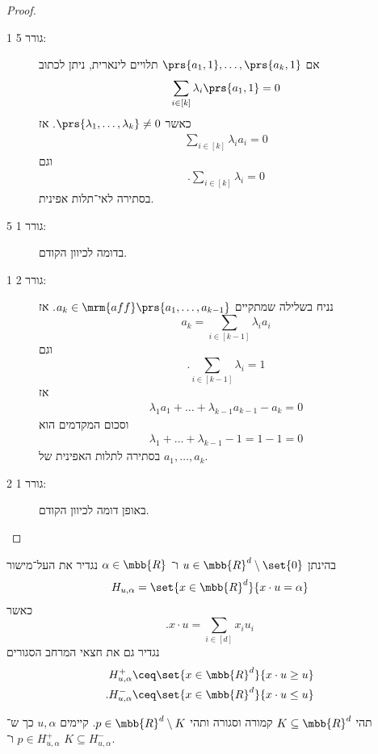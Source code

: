 \documentclass[a4paper,10pt,twoside,openany]{book}
\begin{document}
\begin{proof}
\begin{description}
\item[1 גורר 5:]
אם
$\prs{a_1,1}, \ldots, \prs{a_k,1}$
תלויים לינארית, ניתן לכתוב
\[\sum_{i \in [k]} \lambda_i \prs{a_1, 1} = 0\]
כאשר
$\prs{\lambda_1, \ldots, \lambda_k} \neq 0$.
אז
\begin{align*}
\sum_{i \in [k]} \lambda_i a_i = 0
\end{align*}
וגם
\begin{align*}
\text{.} \sum_{i \in [k]} \lambda_i = 0
\end{align*}
בסתירה לאי־תלות אפינית.
\item[5 גורר 1:]
בדומה לכיוון הקודם.
\item[1 גורר 2:]
נניח בשלילה שמתקיים
$a_k \in \mrm{aff}\prs{a_1, \ldots, a_{k-1}}$.
אז
\[a_k = \sum_{i \in [k-1]} \lambda_i a_i\]
וגם
\[\text{.} \sum_{i \in [k-1]} \lambda_i = 1\]
אז
\begin{align*}
\lambda_1 a_1 + \ldots + \lambda_{k-1} a_{k-1} - a_k = 0
\end{align*}
וסכום המקדמים הוא
\begin{align*}
\lambda_1 + \dots + \lambda_{k-1} - 1 = 1 - 1 = 0
\end{align*}
בסתירה לתלות האפינית של
$a_1, \ldots, a_k$.
\item[2 גורר 1:]
באופן דומה לכיוון הקודם.
\end{description}
\end{proof}

\begin{definition}
בהינתן
$u \in \mbb{R}^d \setminus \set{0}$
ו־%
$\alpha \in \mbb{R}$
נגדיר את העל־מישור
\begin{align*}
H_{u,\alpha} = \set{x \in \mbb{R}^d}{x \cdot u = \alpha}
\end{align*}
כאשר
\[\text{.} x \cdot u = \sum_{i \in [d]} x_i u_i\]
נגדיר גם את חצאי המרחב הסגורים
\begin{align*}
H_{u,\alpha}^+ \ceq \set{x \in \mbb{R}^d}{x \cdot u \geq u} \\
\text{.} H_{u,\alpha}^- \ceq \set{x \in \mbb{R}^d}{x \cdot u \leq u}
\end{align*}
\end{definition}

\begin{theorem}
תהי
$K \subseteq \mbb{R}^d$
קמורה וסגורה ותהי
$p \in \mbb{R}^d \setminus K$.
קיימים
$u,\alpha$
כך ש־%
$p \in H_{u,\alpha}^+$
ו־%
$K \subseteq H_{u,\alpha}^-$.
\end{theorem}
\end{document}
